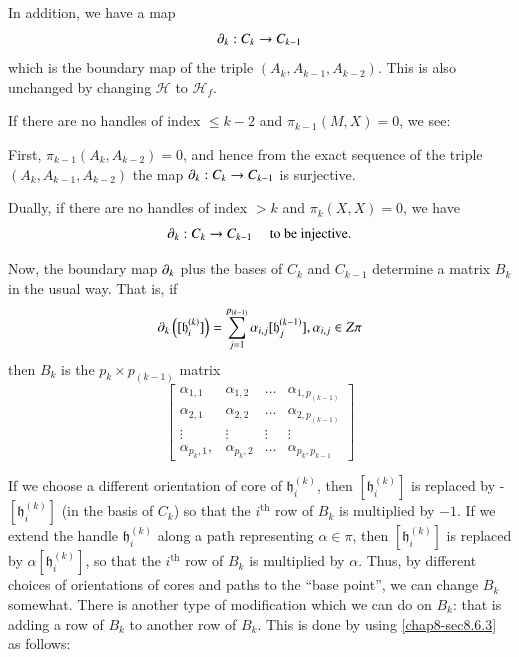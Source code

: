 In addition, we have a map
$$
\partial_{k}:C_{k}\to C_{k-1}
$$
which is the boundary map of the triple $(A_{k},A_{k-1},A_{k-2})$. This is also unchanged by changing $\mathscr{H}$ to $\mathscr{H}_{f}$.

If there are no handles of index $\leq k-2$ and $\pi_{k-1}(M,X)=0$, we see:

First, $\pi_{k-1}(A_{k},A_{k-2})=0$, and hence from the exact sequence of the triple $(A_{k},A_{k-1},A_{k-2})$ the map $\partial_{k}:C_{k}\to C_{k-1}$ is surjective.

Dually, if there are no handles of index $>k$ and $\pi_{k}(X,X)=0$, we have 
$$
\partial_{k}:C_{k}\to C_{k-1}\quad\text{ to be injective.}
$$\pageoriginale

Now, the boundary map $\partial_{k}$ plus the bases of $C_{k}$ and $C_{k-1}$ determine a matrix $B_{k}$ in the usual way. That is, if
$$
\partial_{k}\left([\mathfrak{h}^{(k)}_{i}]\right)=\sum^{p_{(k-1)}}_{j=1}\alpha_{i,j}[\mathfrak{h}^{(k-1)}_{j}],\alpha_{i,j}\in Z\pi
$$
then $B_{k}$ is the $p_{k}\times p_{(k-1)}$ matrix
$$
\begin{bmatrix}
\alpha_{1,1} & \alpha_{1,2} & \ldots & \alpha_{1,p_{(k-1)}}\\
\alpha_{2,1} & \alpha_{2,2} & \ldots & \alpha_{2,p_{(k-1)}}\\
\vdots & \vdots & \vdots & \vdots\\
\alpha_{p_{k},1}, & \alpha_{p_{k},2} & \ldots & \alpha_{p_{k},p_{k-1}}
\end{bmatrix}
$$

If we choose a different orientation of core of $\mathfrak{h}_{i}^{(k)}$, then $[\mathfrak{h}^{(k)}_{i}]$ is replaced by - $[\mathfrak{h}^{(k)}_{i}]$ (in the basis of $C_{k}$) so that the $i^{\text{th}}$ row of $B_{k}$ is multiplied by $-1$. If we extend the handle $\mathfrak{h}^{(k)}_{i}$ along a path representing $\alpha\in \pi$, then $[\mathfrak{h}^{(k)}_{i}]$ is replaced by $\alpha[\mathfrak{h}^{(k)}_{i}]$, so that the $i^{\text{th}}$ row of $B_{k}$ is multiplied by $\alpha$. Thus, by different choices of orientations of cores and paths to the ``base point'', we  can change $B_{k}$ somewhat. There is another type of modification which we can do on $B_{k}$: that is adding a row of $B_{k}$ to another row of $B_{k}$. This is done by using \ref{chap8-sec8.6.3} as follows:

